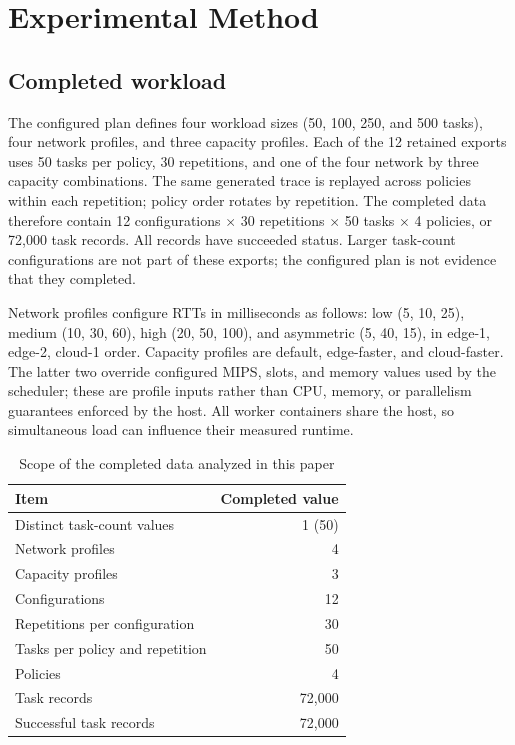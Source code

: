 \documentclass[conference]{IEEEtran}
\begin{document}
        \section{Experimental Method}
        \subsection{Completed workload}
        The configured plan defines four workload sizes (50, 100, 250, and 500 tasks), four network profiles, and three capacity profiles. Each of the 12 retained exports uses 50 tasks per policy, 30 repetitions, and one of the four network by three capacity combinations. The same generated trace is replayed across policies within each repetition; policy order rotates by repetition. The completed data therefore contain 12 configurations $\times$ 30 repetitions $\times$ 50 tasks $\times$ 4 policies, or 72,000 task records. All records have succeeded status. Larger task-count configurations are not part of these exports; the configured plan is not evidence that they completed.

        Network profiles configure RTTs in milliseconds as follows: low (5, 10, 25), medium (10, 30, 60), high (20, 50, 100), and asymmetric (5, 40, 15), in edge-1, edge-2, cloud-1 order. Capacity profiles are default, edge-faster, and cloud-faster. The latter two override configured MIPS, slots, and memory values used by the scheduler; these are profile inputs rather than CPU, memory, or parallelism guarantees enforced by the host. All worker containers share the host, so simultaneous load can influence their measured runtime.

        \begin{table}[t]
        \centering\footnotesize
        \caption{Scope of the completed data analyzed in this paper}
        \label{tab:scope}
        \begin{tabular}{@{}lr@{}}
        \toprule
        Item & Completed value \\
        \midrule
        Distinct task-count values & 1 (50) \\
        Network profiles & 4 \\
        Capacity profiles & 3 \\
        Configurations & 12 \\
        Repetitions per configuration & 30 \\
        Tasks per policy and repetition & 50 \\
        Policies & 4 \\
        Task records & 72,000 \\
        Successful task records & 72,000 \\
        \bottomrule
        \end{tabular}
        \end{table}
\end{document}
